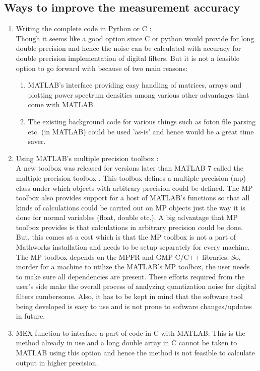 \documentclass[colorlinks=true,pdfstartview=FitV,linkcolor=blue,
            citecolor=red,urlcolor=magenta]{ligodoc}
\begin{document}
	\subsection{Ways to improve the measurement accuracy}
		\begin{enumerate}
			\item Writing the complete code in Python or C  : \\ Though it seems like a good option since C or python would provide for long double precision \cite{longdouble} and hence the noise can be calculated with accuracy for double precision implementation of digital filters. But it is not a feasible option to go forward with because of two main reasons:
				\begin{enumerate}
					\item MATLAB's interface providing easy handling of matrices, arrays and plotting power spectrum densities among various other advantages that come with MATLAB.
					\item The existing background code for various things such as foton file parsing etc. (in MATLAB) could be used 'as-is' and hence would be a great time saver. 
				\end{enumerate}
			\item Using MATLAB's multiple precision toolbox : \\ A new toolbox was released for versions later than MATLAB 7 called the multiple precision toolbox \cite{MP}. This toolbox defines a multiple precision (mp) class under which objects with arbitrary precision could be defined. The MP toolbox also provides support for a host of MATLAB's functions so that all kinds of calculations could be carried out on MP objects just the way it is done for normal variables (float, double etc.). A big advantage that MP toolbox provides is that calculations in arbitrary precision could be done. But, this comes at a cost which is that the MP toolbox is not a part of Mathworks installation and needs to be setup separately for every machine. The MP toolbox depends on the MPFR and GMP C/C++ libraries. So, inorder for a machine to utilize the MATLAB's MP toolbox, the user needs to make sure all dependencies are present. These efforts required from the user's side make the overall process of analyzing quantization noise for digital filters cumbersome. Also, it has to be kept in mind that the software tool being developed is easy to use and is not prone to software changes/updates in future. 
			\item MEX-function to interface a part of code in C with MATLAB: This is the method already in use and a long double array in C cannot be taken to MATLAB using this option and hence the method is not feasible to calculate output in higher precision.

\end{enumerate}
\end{document}
